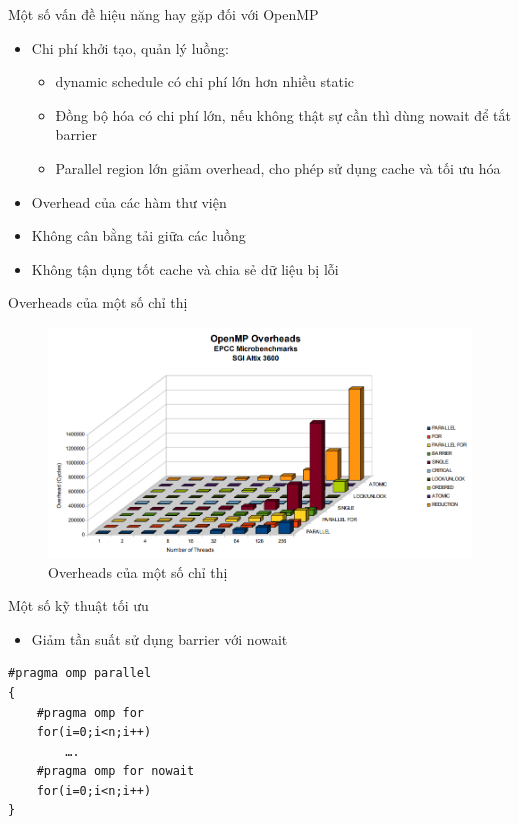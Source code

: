 \documentclass[10pt]{beamer}
\theoremstyle{remark}
\numberwithin{algocf}{section}
\numberwithin{equation}{section}
\numberwithin{dl}{section}
\numberwithin{figure}{section}
\begin{document}
\begin{frame}{Một số vấn đề hiệu năng hay gặp đối với OpenMP}
    \begin{itemize}
        \item Chi phí khởi tạo, quản lý luồng:
        \begin{itemize}
            \item dynamic schedule có chi phí lớn hơn nhiều static
            \item Đồng bộ hóa có chi phí lớn, nếu không thật sự cần thì dùng nowait để tắt barrier
            \item Parallel region lớn giảm overhead, cho phép sử dụng cache và tối ưu hóa
        \end{itemize}
        \item Overhead của các hàm thư viện
        \item Không cân bằng tải giữa các luồng
        \item Không tận dụng tốt cache và chia sẻ dữ liệu bị lỗi
    \end{itemize}
\end{frame}

\begin{frame}{Overheads của một số chỉ thị}
    \begin{figure}[H]
        \centering
        \includegraphics[width=0.8\linewidth]{figures/OpenMP/Overheads_Directives.png}
        \caption{Overheads của một số chỉ thị}
    \end{figure}
\end{frame}

\begin{frame}[fragile]{Một số kỹ thuật tối ưu}
    \begin{itemize}
        \item Giảm tần suất sử dụng barrier với nowait
    \end{itemize}

    \begin{verbatim}
#pragma	omp	parallel	
{	
    #pragma	omp	for
    for(i=0;i<n;i++)	
        ….	
    #pragma	omp	for	nowait
    for(i=0;i<n;i++)	
}	
    \end{verbatim}
\end{frame}
\end{document}

